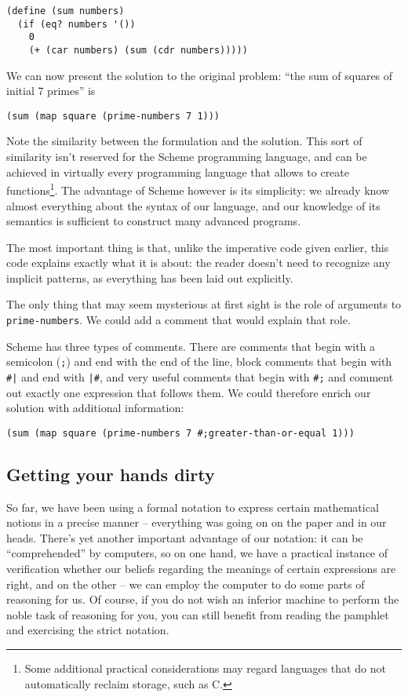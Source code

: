 \begin{Verbatim}[samepage=true]
(define (sum numbers)
  (if (eq? numbers '())
    0
    (+ (car numbers) (sum (cdr numbers)))))
\end{Verbatim}

We can now present the solution to the original problem: ``the sum
of squares of initial 7 primes'' is

\texttt{(sum (map square (prime-numbers 7 1)))}

Note the similarity between the formulation and the solution. This
sort of similarity isn't reserved for the Scheme programming language,
and can be achieved in virtually every programming language that
allows to create functions\footnote{Some additional practical
considerations may regard languages that do not automatically reclaim
storage, such as C.}. The advantage of Scheme however is its
simplicity:
we already know almost everything about the syntax of our language,
and our knowledge of its semantics is sufficient to construct many
advanced programs.

The most important thing is that, unlike the imperative code
given earlier, this code explains exactly what it is about: the
reader doesn't need to recognize any implicit patterns, as
everything has been laid out explicitly.

The only thing that may seem mysterious at first sight is the
role of arguments to \texttt{prime-numbers}. We could add a comment
that would explain that role.

Scheme has three types of comments. There are comments that begin
with a semicolon (\texttt{;}) and end with the end of the line,
block comments that begin with \texttt{\#|} and end with \texttt{|\#},
and very useful comments that begin with \texttt{\#;} and comment out
exactly one expression that follows them. We could therefore
enrich our solution with additional information:

\texttt{(sum (map square (prime-numbers 7 \#;greater-than-or-equal 1)))}

\subsection{Getting your hands dirty}

So far, we have been using a formal notation to express certain
mathematical notions in a precise manner -- everything was going
on on the paper and in our heads. There's yet another important
advantage of our notation: it can be ``comprehended'' by computers,
so on one hand, we have a practical instance of verification whether
our beliefs regarding the meanings of certain expressions are right,
and on the other -- we can employ the computer to do some parts
of reasoning for us. Of course, if you do not wish an inferior machine
to perform the noble task of reasoning for you, you can still
benefit from reading the pamphlet and exercising the strict notation.

